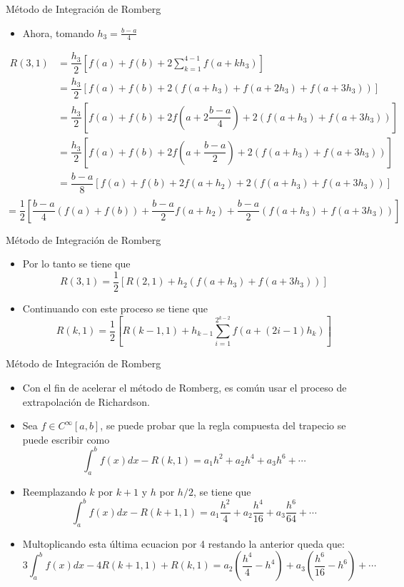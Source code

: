 \documentclass[12pt]{beamer}
\begin{document}
\begin{frame}{M\'etodo de Integraci\'on de Romberg}
  \begin{itemize}
    \item Ahora, tomando $h_3=\frac{b-a}{4}$
  \end{itemize}
    {\footnotesize
    \begin{align*}
      R(3,1) & = \dfrac{h_3}{2}\left[f(a)+ f(b)+2\sum_{k=1}^{4-1}f(a+kh_3)\right]\\
      & = \dfrac{h_3}{2}\left[f(a)+ f(b)+2(f(a+h_3)+f(a+2h_3)+f(a+3h_3)) \right]\\
    & = \dfrac{h_3}{2}\left[f(a)+ f(b)+2f\left(a+2\dfrac{b-a}{4}\right)+2\left(f(a+h_3)+f(a+3h_3)\right)\right]\\  
    & = \dfrac{h_3}{2}\left[f(a)+ f(b)+2f\left(a+\dfrac{b-a}{2}\right)+2\left(f(a+h_3)+f(a+3h_3)\right)\right]\\  
    & = \dfrac{b-a}{8}\left[f(a) + f(b) + 2f(a+h_2)+2(f(a+h_3)+f(a+3h_3))\right]\\  
    \end{align*}
    $$
    =\dfrac{1}{2}\left[\dfrac{b-a}{4}\left(f(a) + f(b)\right) + \dfrac{b-a}{2}f(a+h_2) + \dfrac{b-a}{2}(f(a+h_3)+f(a+3h_3))\right]
    $$}
\end{frame}
\begin{frame}{M\'etodo de Integraci\'on de Romberg}
  \begin{itemize}
    \item Por lo tanto se tiene que
    $$
    R(3,1) = \dfrac{1}{2}\left[R(2,1) + h_2(f(a+h_3)+f(a+3h_3))\right]
    $$
    \item<2-> Continuando con este proceso se tiene que
    $$
    R(k,1) = \dfrac{1}{2}\left[R(k-1,1) + h_{k-1}\sum_{i=1}^{2^{k-2}}f(a+(2i-1)h_{k})\right]
    $$
  \end{itemize}
\end{frame}
\begin{frame}{M\'etodo de Integraci\'on de Romberg}
  \begin{itemize}
    \item Con el fin de acelerar el m\'etodo de Romberg, es com\'un usar el proceso de extrapolaci\'on de Richardson.
    \item<2-> Sea $f \in C^{\infty}[a, b]$, se puede probar que la regla compuesta del trapecio se puede escribir como
    $$
    \int_{a}^{b}f(x)dx-R(k,1) = a_1h^2+a_2h^4+a_3h^6 +\cdots
    $$
    \item<2-> Reemplazando $k$ por $k+1$ y $h$ por $h/2$, se tiene que
    $$
    \int_{a}^{b}f(x)dx-R(k+1,1) = a_1\dfrac{h^2}{4}+a_2\dfrac{h^4}{16}+a_3\dfrac{h^6}{64} +\cdots
    $$
    \item<3->Multoplicando esta \'ultima ecuacion por 4 restando la anterior queda que:
    {\footnotesize
    $$
    3\int_{a}^{b}f(x)dx-4R(k+1,1)+R(k,1) = a_2\left(\dfrac{h^4}{4}-h^4\right) + a_3\left(\dfrac{h^6}{16}-h^6\right)+\cdots
    $$}
  \end{itemize}
\end{frame}
\end{document}
